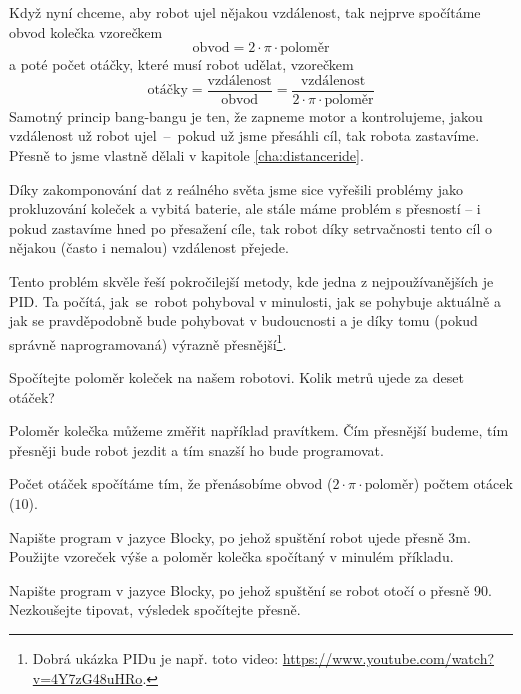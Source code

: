 \documentclass[../main.tex]{subfiles}
\begin{document}
	Když nyní chceme, aby robot ujel nějakou vzdálenost, tak nejprve spočítáme obvod kolečka vzorečkem
	$$\text{obvod} = 2 \cdot \pi \cdot \text{poloměr}$$
	a poté počet otáčky, které musí robot udělat, vzorečkem
	$$\text{otáčky} = \frac{\text{vzdálenost}}{\text{obvod}} =  \frac{\text{vzdálenost}}{2 \cdot \pi \cdot \text{poloměr}}$$ 
	Samotný princip bang-bangu je ten, že zapneme motor a kontrolujeme, jakou vzdálenost už robot ujel~--~pokud už jsme přesáhli cíl, tak robota zastavíme. Přesně to jsme vlastně dělali v kapitole \ref{cha:distanceride}.

	Díky zakomponování dat z reálného světa jsme sice vyřešili problémy jako prokluzování koleček a vybitá baterie, ale stále máme problém s přesností -- i pokud zastavíme hned po přesažení cíle, tak robot díky setrvačnosti tento cíl o nějakou (často i nemalou) vzdálenost přejede.

	Tento problém skvěle řeší pokročilejší metody, kde jedna z nejpoužívanějších je PID. Ta počítá, jak~se~robot pohyboval v minulosti, jak se pohybuje aktuálně a jak se pravděpodobně bude pohybovat v budoucnosti a je díky tomu (pokud správně naprogramovaná) výrazně přesnější\footnote{Dobrá ukázka PIDu je např. toto video: \href{https://www.youtube.com/watch?v=4Y7zG48uHRo}{https://www.youtube.com/watch?v=4Y7zG48uHRo}.}. 

	\begin{question}
		Spočítejte poloměr koleček na našem robotovi. Kolik metrů ujede za deset otáček?
	\end{question}

	\begin{solution}
		Poloměr kolečka můžeme změřit například pravítkem. Čím přesnější budeme, tím přesněji bude robot jezdit a tím snazší ho bude programovat.

		Počet otáček spočítáme tím, že přenásobíme obvod ($2 \cdot \pi \cdot \text{poloměr}$) počtem otácek ($10$).
	\end{solution}

	\begin{question}
		Napište program v jazyce Blocky, po jehož spuštění robot ujede přesně \si{3m}. Použijte vzoreček výše a poloměr kolečka spočítaný v minulém příkladu.
	\end{question}

	\begin{question*}
		Napište program v jazyce Blocky, po jehož spuštění se robot otočí o přesně 90\degree. \mbox{Nezkoušejte} tipovat, výsledek spočítejte přesně.
	\end{question*}
\end{document}
